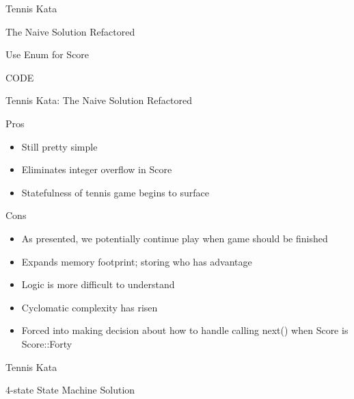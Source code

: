 \documentclass[aspectratio=169]{beamer}
\begin{document}
\begin{frame}{Tennis Kata}
\begin{center}
\begin{Huge}The Naive Solution Refactored\end{Huge}
\linebreak
\begin{Large}
Use Enum for Score
\end{Large}
\end{center}
\end{frame}

\begin{frame}
\begin{center}
\begin{Huge}
CODE
\end{Huge}
\end{center}
\end{frame}

\begin{frame}{Tennis Kata: The Naive Solution Refactored}
\begin{block}{Pros}
\begin{itemize}
\item Still pretty simple
\item Eliminates integer overflow in Score
\item Statefulness of tennis game begins to surface
\end{itemize}
\end{block}
\begin{block}{Cons}
\begin{itemize}
\item As presented, we potentially continue play when game should be finished
\item Expands memory footprint; storing who has advantage
\item Logic is more difficult to understand
\item Cyclomatic complexity has risen
\item Forced into making decision about how to handle calling next() when Score is Score::Forty
\end{itemize}
\end{block}
\end{frame}

\begin{frame}{Tennis Kata}
\begin{center}
\begin{Huge}4-state State Machine Solution
\end{Huge}
\end{center}
\end{frame}
\end{document}

